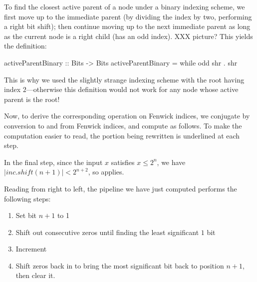 To find the closest active parent of a node under a binary indexing
scheme, we first move up to the immediate parent (by dividing the
index by two, \ie performing a right bit shift); then continue moving
up to the next immediate parent as long as the current node is a right
child (\ie has an odd index).  XXX picture?  This yields the definition:

\begin{code}

activeParentBinary :: Bits -> Bits
activeParentBinary = while odd shr . shr

\end{code}

This is why we used the slightly strange indexing scheme with the root
having index $2$---otherwise this definition would not work for any
node whose active parent is the root!

Now, to derive the corresponding operation on Fenwick indices, we
conjugate by conversion to and from Fenwick indices, and compute as
follows.  To make the computation easier to read, the portion being
rewritten is underlined at each step.

\begin{sproof}
\end{sproof}
In the final step, since the input $x$ satisfies $x \leq 2^n$, we have
$|inc . shift (n+1)| < 2^{n+2}$, so  applies.

Reading from right to left, the pipeline we have just computed
performs the following steps:
\begin{enumerate}
\item Set bit $n+1$ to 1
\item Shift out consecutive zeros until finding the least significant $1$ bit
\item Increment
\item Shift zeros back in to bring the most significant bit back to position $n+1$,
  then clear it.
\end{enumerate}



